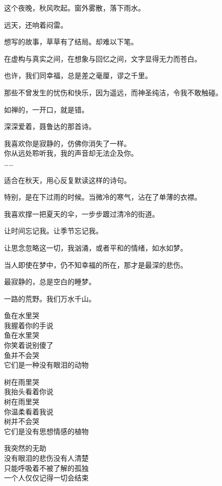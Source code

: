 \documentclass[12pt,a4paper]{article}
\begin{document}
		这个夜晚，秋风吹起。窗外雾散，落下雨水。\par
		远天，还响着闷雷。

		想写的故事，草草有了结局。却难以下笔。\par
		在虚构与真实之间，在想象与回忆之间，文字显得无力而苍白。\par
		也许，我们同幸福，总是差之毫厘，谬之千里。\par
		那些不曾发生的忧伤和快乐，因为遥远，而神圣纯洁，令我不敢触碰。\par
		如禅的，一开口，就是错。

		深深爱着，聂鲁达的那首诗。

		\longpoem{}{}{}
		我喜欢你是寂静的，仿佛你消失了一样。\\
		你从远处聆听我，我的声音却无法企及你。\\
		……
		\endlongpoem


		适合在秋天，用心反复默读这样的诗句。\par
		特别，是在下过雨的时候。当微冷的寒气，沾在了单薄的衣襟。\par
		我喜欢撑一把夏天的伞，一步步踱过清冷的街道。\par
		让时间忘记我。让季节忘记我。\par
		让思念忽略这一切，我汹涌，或者平和的情绪，如水如梦。\par
		当人即使在梦中，仍不知幸福的所在，那才是最深的悲伤。\par
		最寂静的，总是空白的睡梦。

		一路的荒野。我们万水千山。

	\endwriting



		\longpoem{}{}{}
		鱼在水里哭 \\
		我握着你的手说 \\
		鱼在水里哭 \\
		你笑着说别傻了 \\
		鱼并不会哭 \\
		它们是一种没有眼泪的动物


		树在雨里哭 \\
		我抬头看着你说 \\
		树在雨里哭 \\
		你温柔看着我说 \\
		树并不会哭 \\
		它们是没有思想情感的植物


		我突然的无助 \\
		没有眼泪的悲伤没有人清楚 \\
		只能呼吸着不被了解的孤独 \\
		一个人仅仅记得一切会结束
\end{document}

